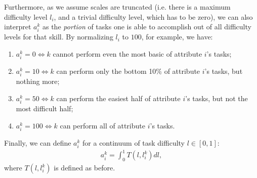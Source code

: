 {\begin{definition}[Skill]
        Furthermore, as we assume scales are truncated (i.e. there is a maximum
        difficulty level $l_i$, and a trivial difficulty level, which has to be zero),
        we can also interpret $a_{i}^{k}$ as the \textit{portion} of tasks one is able
        to accomplish out of all difficulty levels for that skill. By normalizing $l_i$
        to $100$, for example, we have:
        \begin{enumerate}
            \item $a_{i}^{k} = 0 \iff k$ cannot perform even the most basic of attribute $i$'s tasks;
            \item $a_{i}^{k} = 10 \iff k$ can perform only the bottom 10\% of attribute $i$'s tasks, but nothing more;
            \item $a_{i}^{k} = 50 \iff k$ can perform the easiest half of attribute $i$'s tasks, but not the most difficult half;
            \item $a_{i}^{k} = 100 \iff k$ can perform all of attribute $i$'s tasks.
        \end{enumerate}

        Finally, we can define $a_{i}^{k}$ for a continuum of task difficulty $l \in [0,1]$:
        \begin{gather}
            a_{i}^{k} =
            \int_{0}^{1}{
            T(l, l_{i}^{k})
            dl
            }
            ,
        \end{gather}
        where $T(l, l_{i}^{k})$ is defined as before.
    \end{definition}
}


